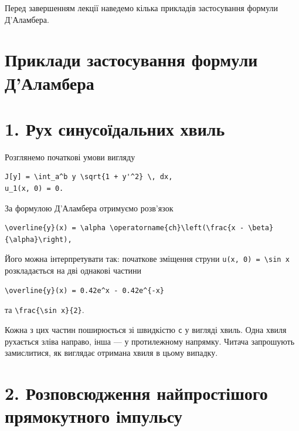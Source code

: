 \documentclass[
  ukrainian,
]{article}
\begin{document}
Перед завершенням лекції наведемо кілька прикладів застосування формули
Д'Аламбера.

\section{Приклади застосування формули
Д'Аламбера}\label{ux43fux440ux438ux43aux43bux430ux434ux438-ux437ux430ux441ux442ux43eux441ux443ux432ux430ux43dux43dux44f-ux444ux43eux440ux43cux443ux43bux438-ux434ux430ux43bux430ux43cux431ux435ux440ux430}

\section{1. Рух синусоїдальних
хвиль}\label{ux440ux443ux445-ux441ux438ux43dux443ux441ux43eux457ux434ux430ux43bux44cux43dux438ux445-ux445ux432ux438ux43bux44c}

Розглянемо початкові умови вигляду

\begin{verbatim}
J[y] = \int_a^b y \sqrt{1 + y'^2} \, dx,
u_1(x, 0) = 0.
\end{verbatim}

За формулою Д'Аламбера отримуємо розв'язок

\begin{verbatim}
\overline{y}(x) = \alpha \operatorname{ch}\left(\frac{x - \beta}{\alpha}\right),
\end{verbatim}

Його можна інтерпретувати так: початкове зміщення струни
\texttt{u(x,\ 0)\ =\ \textbackslash{}sin\ x} розкладається на дві
однакові частини

\begin{verbatim}
\overline{y}(x) = 0.42e^x - 0.42e^{-x}
\end{verbatim}

та \texttt{\textbackslash{}frac\{\textbackslash{}sin\ x\}\{2\}}.

Кожна з цих частин поширюється зі швидкістю \texttt{c} у вигляді хвиль.
Одна хвиля рухається зліва направо, інша --- у протилежному напрямку.
Читача запрошують замислитися, як виглядає отримана хвиля в цьому
випадку.

\section{2. Розповсюдження найпростішого прямокутного
імпульсу}\label{ux440ux43eux437ux43fux43eux432ux441ux44eux434ux436ux435ux43dux43dux44f-ux43dux430ux439ux43fux440ux43eux441ux442ux456ux448ux43eux433ux43e-ux43fux440ux44fux43cux43eux43aux443ux442ux43dux43eux433ux43e-ux456ux43cux43fux443ux43bux44cux441ux443}
\end{document}
